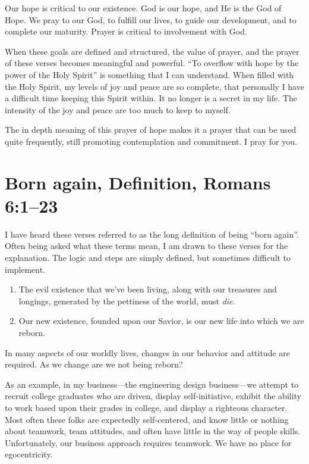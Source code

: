 \documentclass[12pt]{memoir}
\begin{document}
Our hope is critical to our existence. God is our hope, and
He is the God of Hope. We pray to our God, to fulfill our lives, to
guide our development, and to complete our maturity. Prayer is critical
to involvement with God.

When these goals are defined and structured, the value of prayer,
and the prayer of these verses becomes meaningful and powerful.
``To overflow with hope by the power of the Holy Spirit'' is something that I can understand. When filled with the Holy Spirit,
my levels of joy and peace are so complete, that personally I have
a difficult time keeping this Spirit within. It no longer is a secret
in my life. The intensity of the joy and peace are too much to keep
to myself.

The in depth meaning of this prayer of hope makes it a prayer that
can be used quite frequently, still promoting contemplation and commitment.
I pray for you.

\section[Born again, Definition]{Born again, Definition, Romans 6:1--23}

I have heard these verses referred to as the long definition of being
``born again''. Often being asked what these terms mean, I am drawn
to these verses for the explanation. The logic and steps are simply
defined, but sometimes difficult to implement. 
\begin{enumerate}
\item The evil existence that we've been living, along with our treasures
and longings, generated by the pettiness of the world, must \emph{die}. 
\item Our new existence, founded upon our Savior, is our new life into which
we are reborn. 
\end{enumerate}
In many aspects of our worldly lives, changes in our behavior and
attitude are required. As we change are we not being reborn?

As an example, in my business---the engineering design business---we attempt to recruit college graduates who are driven, display self-initiative, exhibit the ability to work based upon their grades in college, and display a righteous character.
Most often these folks are expectedly self-centered, and know little or nothing about teamwork, team attitudes, and often have little in the way of people skills.
Unfortunately, our business approach requires teamwork. We have no place for egocentricity.
\end{document}
